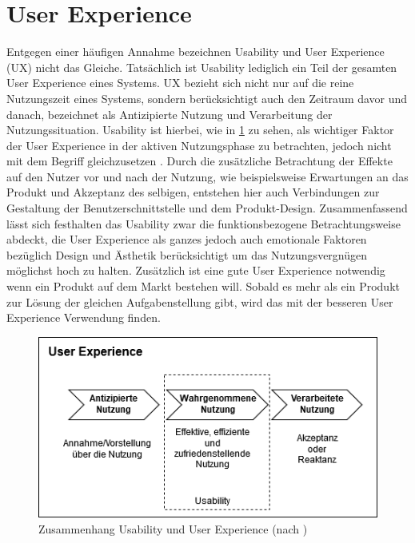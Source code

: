 \section{User Experience}
Entgegen einer häufigen Annahme bezeichnen Usability und User Experience (UX) nicht das Gleiche.
Tatsächlich ist Usability lediglich ein Teil der gesamten User Experience eines Systems\cite{Knight.2019c}.
UX bezieht sich nicht nur auf die reine Nutzungszeit eines Systems, sondern berücksichtigt auch den Zeitraum davor und danach, bezeichnet als Antizipierte Nutzung und Verarbeitung der Nutzungssituation.
Usability ist hierbei, wie in \cref{fig:UX} zu sehen,  als wichtiger Faktor der User Experience in der aktiven Nutzungsphase zu betrachten, jedoch nicht mit dem Begriff gleichzusetzen \cite{Sarodnick.2016}.
Durch die zusätzliche Betrachtung der Effekte auf den Nutzer vor und nach der Nutzung, wie beispielsweise Erwartungen an das Produkt und Akzeptanz des selbigen, entstehen hier auch Verbindungen zur Gestaltung der Benutzerschnittstelle und dem Produkt-Design\cite{Richter.2016}.
Zusammenfassend lässt sich festhalten das Usability zwar die funktionsbezogene Betrachtungsweise abdeckt, die User Experience als ganzes jedoch auch emotionale Faktoren bezüglich Design und Ästhetik berücksichtigt um das Nutzungsvergnügen möglichst hoch zu halten.
Zusätzlich ist eine gute User Experience notwendig wenn ein Produkt auf dem Markt bestehen will.
Sobald es mehr als ein Produkt zur Lösung der gleichen Aufgabenstellung gibt, wird das mit der besseren User Experience Verwendung finden\cite{Knight.2019c}.

\begin{figure} [!h]
\begin{center}
  \includegraphics[scale=0.7]{figures/UX.png}
  \caption{Zusammenhang Usability und User Experience (nach \cite{Sarodnick.2016})}
  \label{fig:UX}
\end{center}
\end{figure}

